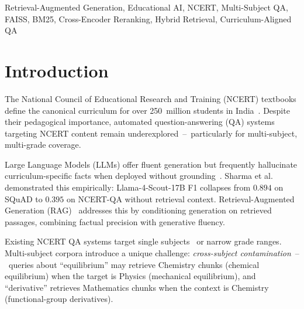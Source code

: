 \documentclass[conference]{IEEEtran}
\begin{document}
\begin{IEEEkeywords}
Retrieval-Augmented Generation, Educational AI, NCERT, Multi-Subject QA, FAISS, BM25, Cross-Encoder Reranking, Hybrid Retrieval, Curriculum-Aligned QA
\end{IEEEkeywords}

\section{Introduction}

The National Council of Educational Research and Training (NCERT) textbooks define the canonical curriculum for over 250~million students in India~\cite{ncert_scale}. Despite their pedagogical importance, automated question-answering (QA) systems targeting NCERT content remain underexplored~--~particularly for multi-subject, multi-grade coverage.

Large Language Models (LLMs) offer fluent generation but frequently hallucinate curriculum-specific facts when deployed without grounding~\cite{ouyang2022training}. Sharma et al.~\cite{sharma2025pustakai} demonstrated this empirically: Llama-4-Scout-17B F1 collapses from $0.894$ on SQuAD to $0.395$ on NCERT-QA without retrieval context. Retrieval-Augmented Generation (RAG)~\cite{lewis2020rag} addresses this by conditioning generation on retrieved passages, combining factual precision with generative fluency.

Existing NCERT QA systems target single subjects~\cite{sharma2025pustakai,rao2026team05} or narrow grade ranges. Multi-subject corpora introduce a unique challenge: \emph{cross-subject contamination}~--~queries about ``equilibrium'' may retrieve Chemistry chunks (chemical equilibrium) when the target is Physics (mechanical equilibrium), and ``derivative'' retrieves Mathematics chunks when the context is Chemistry (functional-group derivatives).
\end{document}
